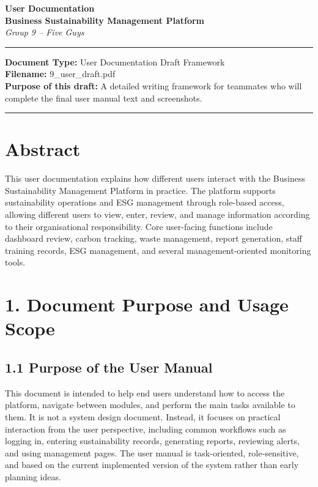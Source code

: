 \documentclass[10pt,a4paper]{article}
\begin{document}
\begin{center}
{\Large \textbf{User Documentation}}\\
\vspace{0.25em}
{\large \textbf{Business Sustainability Management Platform}}\\
\vspace{0.35em}
{\small\itshape Group 9 -- Five Guys}
\end{center}

\vspace{0.35em}
\hrule
\vspace{0.5em}
\small
\textbf{Document Type:} User Documentation Draft Framework\\
\textbf{Filename:} 9\_user\_draft.pdf\\
\textbf{Purpose of this draft:} A detailed writing framework for teammates who will complete the final user manual text and screenshots.

\vspace{0.5em}
\hrule
\vspace{0.6em}
\normalsize

\section*{Abstract}
This user documentation explains how different users interact with the Business Sustainability Management Platform in practice. The platform supports sustainability operations and ESG management through role-based access, allowing different users to view, enter, review, and manage information according to their organisational responsibility. Core user-facing functions include dashboard review, carbon tracking, waste management, report generation, staff training records, ESG management, and several management-oriented monitoring tools.

\section*{1. Document Purpose and Usage Scope}

\subsection*{1.1 Purpose of the User Manual}
This document is intended to help end users understand how to access the platform, navigate between modules, and perform the main tasks available to them. It is not a system design document. Instead, it focuses on practical interaction from the user perspective, including common workflows such as logging in, entering sustainability records, generating reports, reviewing alerts, and using management pages. The user manual is task-oriented, role-sensitive, and based on the current implemented version of the system rather than early planning ideas.
\end{document}
